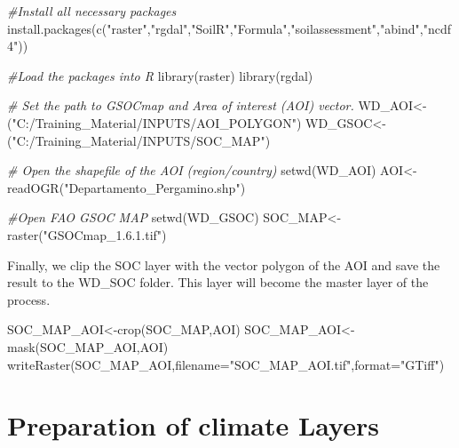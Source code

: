 \documentclass[
  10pt,
  b5paper,
]{book}
\newenvironment{Shaded}{\begin{snugshade}}{\end{snugshade}}
\newcommand{\AttributeTok}[1]{\textcolor[rgb]{0.77,0.63,0.00}{#1}}
\newcommand{\CommentTok}[1]{\textcolor[rgb]{0.56,0.35,0.01}{\textit{#1}}}
\newcommand{\FunctionTok}[1]{\textcolor[rgb]{0.00,0.00,0.00}{#1}}
\newcommand{\NormalTok}[1]{#1}
\newcommand{\OtherTok}[1]{\textcolor[rgb]{0.56,0.35,0.01}{#1}}
\newcommand{\StringTok}[1]{\textcolor[rgb]{0.31,0.60,0.02}{#1}}
\begin{document}
\begin{Shaded}
\begin{Highlighting}[]
\CommentTok{\#Install all necessary packages}
\FunctionTok{install.packages}\NormalTok{(}\FunctionTok{c}\NormalTok{(}\StringTok{"raster"}\NormalTok{,}\StringTok{"rgdal"}\NormalTok{,}\StringTok{"SoilR"}\NormalTok{,}\StringTok{"Formula"}\NormalTok{,}\StringTok{"soilassessment"}\NormalTok{,}\StringTok{"abind"}\NormalTok{,}\StringTok{"ncdf4"}\NormalTok{))}

\CommentTok{\#Load the packages into R}
\FunctionTok{library}\NormalTok{(raster)}
\FunctionTok{library}\NormalTok{(rgdal)}

\CommentTok{\# Set the path to GSOCmap and Area of interest (AOI) vector.}
\NormalTok{WD\_AOI}\OtherTok{\textless{}{-}}\NormalTok{(}\StringTok{"C:/Training\_Material/INPUTS/AOI\_POLYGON"}\NormalTok{)}
\NormalTok{WD\_GSOC}\OtherTok{\textless{}{-}}\NormalTok{(}\StringTok{"C:/Training\_Material/INPUTS/SOC\_MAP"}\NormalTok{)}

\CommentTok{\# Open the shapefile of the AOI (region/country)}
\FunctionTok{setwd}\NormalTok{(WD\_AOI)}
\NormalTok{AOI}\OtherTok{\textless{}{-}}\FunctionTok{readOGR}\NormalTok{(}\StringTok{"Departamento\_Pergamino.shp"}\NormalTok{)}

\CommentTok{\#Open FAO GSOC MAP }
\FunctionTok{setwd}\NormalTok{(WD\_GSOC)}
\NormalTok{SOC\_MAP}\OtherTok{\textless{}{-}}\FunctionTok{raster}\NormalTok{(}\StringTok{"GSOCmap\_1.6.1.tif"}\NormalTok{)}
\end{Highlighting}
\end{Shaded}

Finally, we clip the SOC layer with the vector polygon of the AOI and save the result to the WD\_SOC folder. This layer will become the master layer of the process.

\begin{Shaded}
\begin{Highlighting}[]
\NormalTok{SOC\_MAP\_AOI}\OtherTok{\textless{}{-}}\FunctionTok{crop}\NormalTok{(SOC\_MAP,AOI)}
\NormalTok{SOC\_MAP\_AOI}\OtherTok{\textless{}{-}}\FunctionTok{mask}\NormalTok{(SOC\_MAP\_AOI,AOI)}
\FunctionTok{writeRaster}\NormalTok{(SOC\_MAP\_AOI,}\AttributeTok{filename=}\StringTok{"SOC\_MAP\_AOI.tif"}\NormalTok{,}\AttributeTok{format=}\StringTok{"GTiff"}\NormalTok{)}
\end{Highlighting}
\end{Shaded}

\hypertarget{preparation-of-climate-layers}{%
\section{Preparation of climate Layers}\label{preparation-of-climate-layers}}
\end{document}
